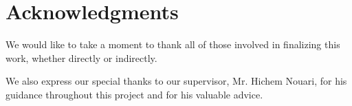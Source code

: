 \section*{Acknowledgments}

We would like to take a moment to thank all of those involved in finalizing this work, whether directly or indirectly.

We also express our special thanks to our supervisor, Mr. Hichem Nouari, for his guidance throughout this project and for his valuable advice.

\newpage
